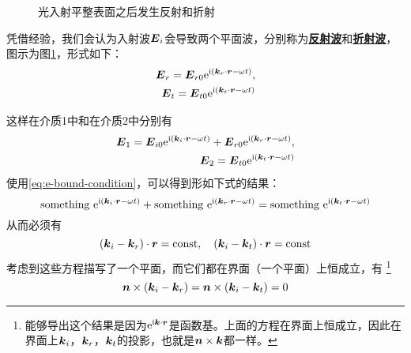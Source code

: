 \documentclass[UTF8, a4paper]{ctexart}
\newcommand*{\const}{\mathrm{const}}
\newcommand*{\ii}{\mathrm{i}}
\newcommand*{\ee}{\mathrm{e}}
\newcommand*{\concept}[1]{\underline{\textbf{#1}}}
\begin{document}
\begin{figure}
    \centering
    \caption{光入射平整表面之后发生反射和折射}
    \label{fig:ray-refraction}
\end{figure}

凭借经验，我们会认为入射波$\vb*{E}_i$会导致两个平面波，分别称为\concept{反射波}和\concept{折射波}，图示为图\ref{fig:ray-refraction}，形式如下：
\[
    \begin{split}
        \vb*{E}_r = \vb*{E}_{r0} \ee^{\ii(\vb*{k}_r \cdot \vb*{r} - \omega t)}, \\
        \vb*{E}_t = \vb*{E}_{t0} \ee^{\ii(\vb*{k}_t \cdot \vb*{r} - \omega t)}
    \end{split}
\]

这样在介质1中和在介质2中分别有
\[
    \begin{split}
        \vb*{E}_1 = \vb*{E}_{i0} \ee^{\ii(\vb*{k}_i \cdot \vb*{r} - \omega t)} +  \vb*{E}_{r0} \ee^{\ii(\vb*{k}_r \cdot \vb*{r} - \omega t)}, \\
        \vb*{E}_2 = \vb*{E}_{t0} \ee^{\ii(\vb*{k}_t \cdot \vb*{r} - \omega t)}
    \end{split}
\]
使用\eqref{eq:e-bound-condition}，可以得到形如下式的结果：
\[
    \text{something } \ee^{\ii(\vb*{k}_i \cdot \vb*{r} - \omega t)} + \text{something } \ee^{\ii(\vb*{k}_r \cdot \vb*{r} - \omega t)} = \text{something } \ee^{\ii(\vb*{k}_t \cdot \vb*{r} - \omega t)}
\]
从而必须有
\[
    (\vb*{k}_i - \vb*{k}_r) \cdot \vb*{r} = \const, \quad (\vb*{k}_i - \vb*{k}_t) \cdot \vb*{r} = \const
\]
考虑到这些方程描写了一个平面，而它们都在界面（一个平面）上恒成立，有%
\footnote{能够导出这个结果是因为$\ee^{\ii \vb*{k} \cdot \vb*{r}}$是函数基。上面的方程在界面上恒成立，因此在界面上$\vb*{k}_i$，$\vb*{k}_r$，$\vb*{k}_t$的投影，也就是$\vb*{n} \times \vb*{k}$都一样。}
\begin{equation}
    \vb*{n} \times (\vb*{k}_i - \vb*{k}_r) = \vb*{n} \times (\vb*{k}_i - \vb*{k}_t) = 0
    \label{eq:k-and-n}
\end{equation}
\end{document}
